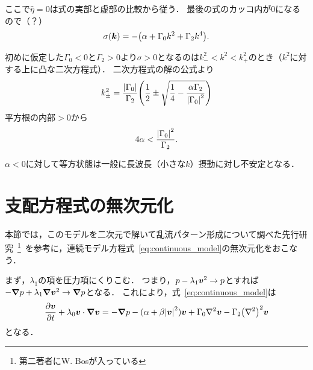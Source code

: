 \documentclass[12pt,dvipdfmx,svgnames,a4paper,uplatex]{ujarticle}
\theoremstyle{plain}
\begin{document}
ここで\(\hat{\eta}=0\)は式の実部と虚部の比較から従う．
最後の式のカッコ内が\(0\)になるので（？）
\begin{equation}
  \sigma(\vb*{k}) = -\qty(\alpha + \Gamma_0 k^2 + \Gamma_2 k^4).
  \label{eq:sigma}
\end{equation}

初めに仮定した\(\Gamma_0 < 0\)と\(\Gamma_2 > 0\)より\(\sigma > 0\)となるのは\(k_-^2 < k^2 < k_+^2\)のとき（\(k^2\)に対する上に凸な二次方程式）．
二次方程式の解の公式より
\begin{equation}
  k_{\pm}^2 = \frac{\abs{\Gamma_0}}{\Gamma_2} \qty( \frac{1}{2} \pm \sqrt{ \frac{1}{4} - \frac{\alpha \Gamma_2}{\abs{\Gamma_0}^2} } )
  \label{eq:k_pm}
\end{equation}
平方根の内部\(>0\)から
\begin{equation}
  4\alpha < \frac{\abs{\Gamma_0}^2}{\Gamma_2}.
  \label{eq:alpha_condition}
\end{equation}

\(\alpha < 0\)に対して等方状態は一般に長波長（小さな\(k\)）摂動に対し不安定となる．


\section{支配方程式の無次元化}
\label{sec:governing_equation_nondimensionalisation}

本節では，このモデルを二次元で解いて乱流パターン形成について調べた先行研究~\footnote{第二著者にW. Bosが入っている}~\cite[脚注28]{James2017}を参考に，連続モデル方程式~\ref{eq:continuous_model}の無次元化をおこなう．

まず，\(\lambda_1\)の項を圧力項にくりこむ．
つまり，\(p - \lambda_1 \vb*{v}^2 \to p\)とすれば\(-\grad{p} + \lambda_1 \grad{\vb*{v}^2} \to \grad{p}\)となる．
これにより，式~\ref{eq:continuous_model}は
\begin{equation}
  \pdv{\vb*{v}}{t} + \lambda_0 \vb*{v} \cdot \grad{\vb*{v}} = -\grad{p} - (\alpha + \beta \abs{\vb*{v}}^2) \vb*{v} + \Gamma_0 \laplacian \vb*{v} - \Gamma_2 \qty(\laplacian)^2 \vb*{v}
  \label{eq:continuous_model_absorb_lambda1}
\end{equation}
となる．
\end{document}
